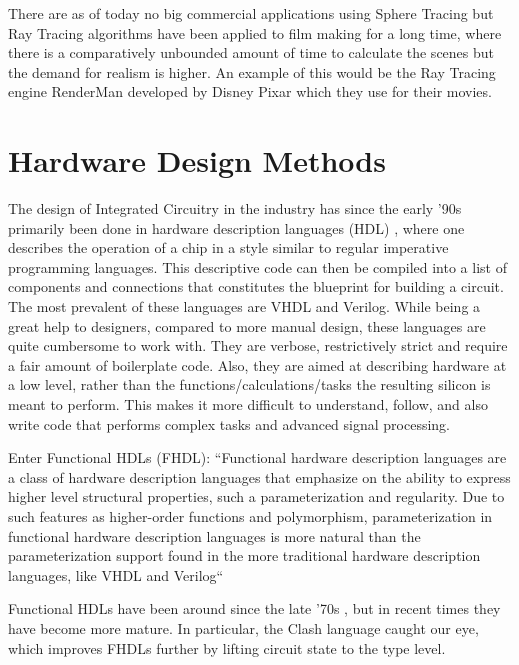 There are as of today no big commercial applications using Sphere Tracing but
Ray Tracing algorithms have been applied to film making for a long time, where
there is a comparatively unbounded amount of time to calculate the scenes but
the demand for realism is higher. An example of this would be the Ray Tracing
engine RenderMan developed by Disney Pixar which they use for their
movies.\cite{TODO}

\section{ Hardware Design Methods  } 

The design of Integrated Circuitry in the industry has since the early '90s 
primarily been done in hardware description languages (HDL) \cite{ChenG}, 
where one describes the operation of a chip in a style similar to regular 
imperative programming languages. This descriptive code can then be compiled 
into a list of components and connections that constitutes the blueprint for 
building a circuit. The most prevalent of these languages are VHDL and 
Verilog. While being a great help to designers, compared to more manual 
design, these languages are quite cumbersome to work with. They are verbose, 
restrictively strict and require a fair amount of boilerplate code. Also, 
they are aimed at describing hardware at a low level, rather than the 
functions/calculations/tasks the resulting silicon is meant to perform. This 
makes it more difficult to understand, follow, and also write code that 
performs complex tasks and advanced signal processing.

Enter Functional HDLs (FHDL): ``Functional hardware description languages are a class of hardware description languages that emphasize on the ability to express higher level structural properties, such a parameterization and regularity.  Due to such features as higher-order functions and polymorphism, parameterization in functional hardware description languages is more natural than the parameterization support found in the more traditional hardware description languages, like VHDL and Verilog`` \cite{Baaij}

Functional HDLs have been around since the late '70s \cite{ChenG}, but in 
recent times they have become more mature. In particular, the Clash language
caught our eye, which improves FHDLs further by lifting circuit state to the 
type level.
